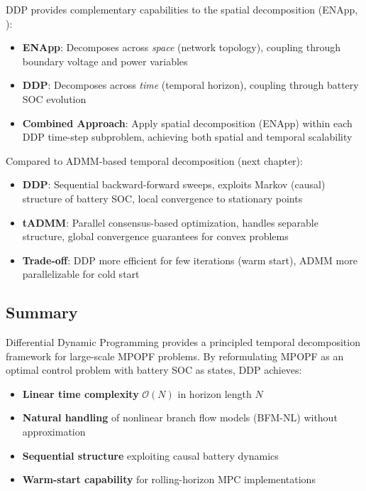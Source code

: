 DDP provides complementary capabilities to the spatial decomposition (ENApp, ):

\begin{itemize}
    \item \textbf{ENApp}: Decomposes across \textit{space} (network topology), coupling through boundary voltage and power variables
    \item \textbf{DDP}: Decomposes across \textit{time} (temporal horizon), coupling through battery SOC evolution
    \item \textbf{Combined Approach}: Apply spatial decomposition (ENApp) within each DDP time-step subproblem, achieving both spatial and temporal scalability
\end{itemize}

Compared to ADMM-based temporal decomposition (next chapter):
\begin{itemize}
    \item \textbf{DDP}: Sequential backward-forward sweeps, exploits Markov (causal) structure of battery SOC, local convergence to stationary points
    \item \textbf{tADMM}: Parallel consensus-based optimization, handles separable structure, global convergence guarantees for convex problems
    \item \textbf{Trade-off}: DDP more efficient for few iterations (warm start), ADMM more parallelizable for cold start
\end{itemize}

\subsection{Summary}

Differential Dynamic Programming provides a principled temporal decomposition framework for large-scale MPOPF problems. By reformulating MPOPF as an optimal control problem with battery SOC as states, DDP achieves:

\begin{itemize}
    \item \textbf{Linear time complexity} $\mathcal{O}(N)$ in horizon length $N$
    \item \textbf{Natural handling} of nonlinear branch flow models (BFM-NL) without approximation
    \item \textbf{Sequential structure} exploiting causal battery dynamics
    \item \textbf{Warm-start capability} for rolling-horizon MPC implementations
\end{itemize}

